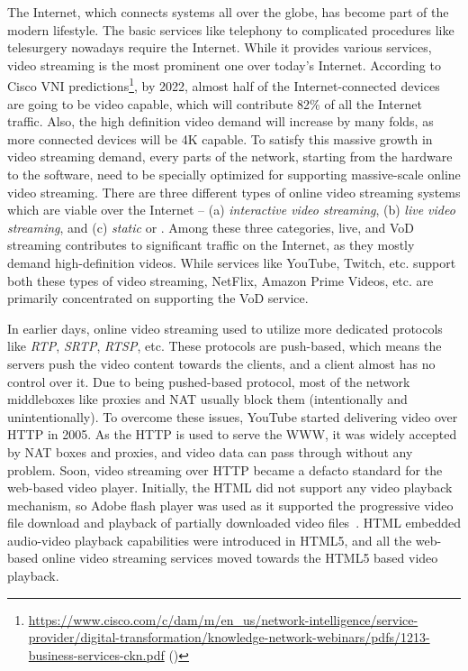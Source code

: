 The Internet, which connects systems all over the globe, has become part of the modern lifestyle. The basic services like telephony to complicated procedures like telesurgery nowadays require the Internet. While it provides various services, video streaming is the most prominent one over today's Internet. According to Cisco \ac{VNI} predictions\footnote{\url{https://www.cisco.com/c/dam/m/en_us/network-intelligence/service-provider/digital-transformation/knowledge-network-webinars/pdfs/1213-business-services-ckn.pdf} (\lastaccessedtoday)}, by 2022, almost half of the Internet-connected devices are going to be video capable, which will contribute 82\% of all the Internet traffic. Also, the high definition video demand will increase by many folds, as more connected devices will be 4K capable. To satisfy this massive growth in video streaming demand, every parts of the network, starting from the hardware to the software, need to be specially optimized for supporting massive-scale online video streaming. There are three different types of online video streaming systems which are viable over the Internet -- (a) \textit{interactive video streaming}, (b) \textit{live video streaming}, and (c) \textit{static} or . Among these three categories, live, and \ac{VoD} streaming contributes to significant traffic on the Internet, as they mostly demand high-definition videos. While services like YouTube, Twitch, etc. support both these types of video streaming, NetFlix, Amazon Prime Videos, etc. are primarily concentrated on supporting the \ac{VoD} service. 

In earlier days, online video streaming used to utilize more dedicated protocols like \textit{\ac{RTP}}, \textit{\ac{SRTP}}, \textit{\ac{RTSP}}, etc. These protocols are push-based, which means the servers push the video content towards the clients, and a client almost has no control over it. Due to being pushed-based protocol, most of the network middleboxes like proxies and \ac{NAT} usually block them (intentionally and unintentionally). To overcome these issues, YouTube started delivering video over \ac{HTTP} in 2005. As the \ac{HTTP} is used to serve the \ac{WWW}, it was widely accepted by \ac{NAT} boxes and proxies, and video data can pass through without any problem. Soon, video streaming over \ac{HTTP} became a defacto standard for the web-based video player. Initially, the \ac{HTML} did not support any video playback mechanism, so Adobe flash player was used as it supported the progressive video file download and playback of partially downloaded video files~\cite{gill2007youtube}. \ac{HTML} embedded audio-video playback capabilities were introduced in \ac{HTML5}, and all the web-based online video streaming services moved towards the \ac{HTML5} based video playback.

